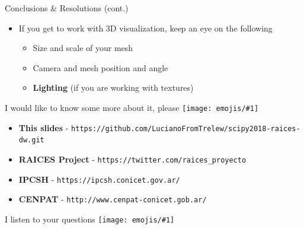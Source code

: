 \documentclass{beamer}
\newcommand{\emoji}[1]{\texttt{[image: emojis/\#1]}}
\begin{document}
\begin{frame}[fragile]{Conclusions \& Resolutions (cont.)}
    \begin{itemize}
        \item If you get to work with 3D visualization, keep an eye on the following
        \begin{itemize}
            \item Size and scale of your mesh
            \item Camera and mesh position and angle
            \item \textbf{Lighting} (if you are working with textures) 
        \end{itemize}
    \end{itemize}
\end{frame}

\begin{frame}[fragile]{I would like to know some more about it, please \emoji{nerd.png}}
    \begin{itemize}
        \item \textbf{This slides} - {\scriptsize\texttt{https://github.com/LucianoFromTrelew/scipy2018-raices-dw.git}}  
        \item \textbf{RAICES Project} - \texttt{https://twitter.com/raices\_proyecto}
        \item \textbf{IPCSH} - \texttt{https://ipcsh.conicet.gov.ar/} 
        \item \textbf{CENPAT} - \texttt{http://www.cenpat-conicet.gob.ar/} 
    \end{itemize}
\end{frame}

\begin{frame}[fragile]{}
    \begin{center}
        \Large 
        I listen to your questions \emoji{cowboy.png}
    \end{center}
\end{frame}
\end{document}

